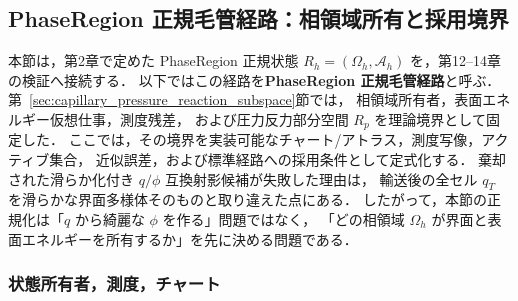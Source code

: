 %
%
\subsection{PhaseRegion 正規毛管経路：相領域所有と採用境界}
\label{sec:ao_fast_state_space}

本節は，第2章で定めた PhaseRegion 正規状態
$R_h=(\Omega_h,\mathcal{A}_h)$ を，第12--14章の検証へ接続する．
以下ではこの経路を\textbf{PhaseRegion 正規毛管経路}と呼ぶ．
第~\ref{sec:capillary_pressure_reaction_subspace}節では，
相領域所有者，表面エネルギー仮想仕事，測度残差，
および圧力反力部分空間 $R_p$ を理論境界として固定した．
ここでは，その境界を実装可能なチャート/アトラス，測度写像，アクティブ集合，
近似誤差，および標準経路への採用条件として定式化する．
棄却された滑らか化付き $q/\phi$ 互換射影候補が失敗した理由は，
輸送後の全セル $q_T$ を滑らかな界面多様体そのものと取り違えた点にある．
したがって，本節の正規化は「$q$ から綺麗な $\phi$ を作る」問題ではなく，
「どの相領域 $\Omega_h$ が界面と表面エネルギーを所有するか」を先に決める問題である．

\subsubsection{状態所有者，測度，チャート}
\label{sec:ao_state_ownership}

